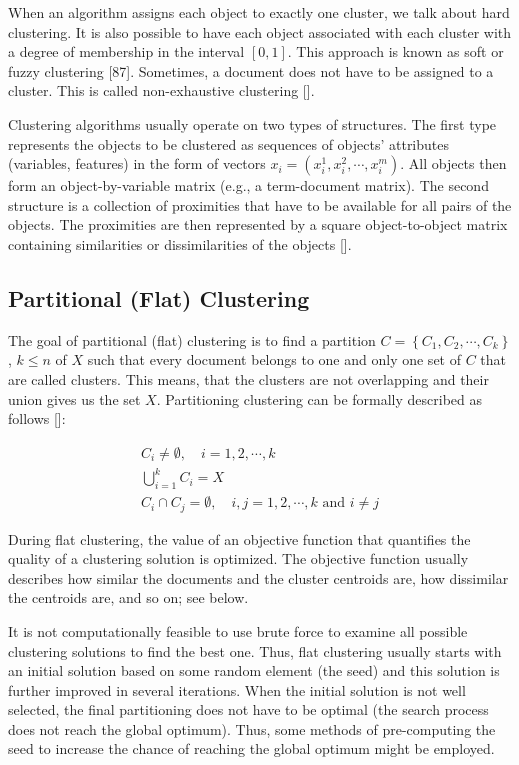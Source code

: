When an algorithm assigns each object to exactly one cluster, we talk about hard clustering. It is also possible to have each object associated with each cluster with a degree of membership in the interval $[0,1]$. This approach is known as soft or fuzzy clustering [87]. Sometimes, a document does not have to be assigned to a cluster. This is called non-exhaustive clustering [\cite{ref277}].

Clustering algorithms usually operate on two types of structures. The first type represents the objects to be clustered as sequences of objects' attributes (variables, features) in the form of vectors $x_{i}=\left(x_{i}^{1}, x_{i}^{2}, \cdots, x_{i}^{m}\right)$. All objects then form an object-by-variable matrix (e.g., a term-document matrix). The second structure is a collection of proximities that have to be available for all pairs of the objects. The proximities are then represented by a square object-to-object matrix containing similarities or dissimilarities of the objects [\cite{ref142}].

\subsection{Partitional (Flat) Clustering}
The goal of partitional (flat) clustering is to find a partition $C=\left\{C_{1}, C_{2}, \cdots, C_{k}\right\}$, $k \leq n$ of $X$ such that every document belongs to one and only one set of $C$ that are called clusters. This means, that the clusters are not overlapping and their union gives us the set $X$. Partitioning clustering can be formally described as follows [\cite{ref285}]:


\begin{gather*}
C_{i} \neq \emptyset, \quad i=1,2, \cdots, k \\
\bigcup_{i=1}^{k} C_{i}=X  \tag{12.12}\\
C_{i} \cap C_{j}=\emptyset, \quad i, j=1,2, \cdots, k \text { and } i \neq j
\end{gather*}


During flat clustering, the value of an objective function that quantifies the quality of a clustering solution is optimized. The objective function usually describes how similar the documents and the cluster centroids are, how dissimilar the centroids are, and so on; see below.

It is not computationally feasible to use brute force to examine all possible clustering solutions to find the best one. Thus, flat clustering usually starts with an initial solution based on some random element (the seed) and this solution is further improved in several iterations. When the initial solution is not well selected, the final partitioning does not have to be optimal (the search process does not reach the global optimum). Thus, some methods of pre-computing the seed to increase the chance of reaching the global optimum might be employed.

